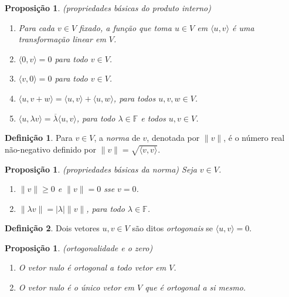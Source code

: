 \documentclass[12pt]{article}
\theoremstyle{plain}
\newtheorem{prop}[thm]{Proposição}
\theoremstyle{definition}
\newtheorem{defn}{Definição}[section]
\theoremstyle{remark}
\begin{document}
\begin{prop} (propriedades básicas do produto interno)
    \begin{enumerate}
        \item [\textup{(a)}] Para cada \(v \in V\) fixado, a função que toma \(u \in V\) em \(\langle u, v \rangle\) é uma transformação linear em \(V\).
        \item [\textup{(b)}] \(\langle 0, v \rangle = 0\) para todo \(v \in V\).
        \item [\textup{(c)}] \(\langle v, 0 \rangle = 0\) para todo \(v \in V\).
        \item [\textup{(d)}] \(\langle u, v + w \rangle = \langle u, v \rangle + \langle u, w \rangle\), para todos \(u, v, w \in V\).
        \item [\textup{(e)}] \(\langle u, \lambda v \rangle = \overline{\lambda} \langle u, v \rangle\), para todo \(\lambda \in \mathbb{F}\) e todos \(u, v \in V\).
    \end{enumerate}
\end{prop}

\begin{defn}
    Para \(v \in V\), a \emph{norma} de \(v\), denotada por \(\|v\|\), é o número real não-negativo definido por \(\|v\| = \sqrt{\langle v, v \rangle}\).
\end{defn}

\begin{prop} (propriedades básicas da norma)
    Seja \(v \in V\).
    \begin{enumerate}
        \item [\textup{(a)}] \(\|v\| \geq 0\) e \(\|v\| = 0\) sse \(v = 0\).
        \item [\textup{(b)}] \(\|\lambda v\| = |\lambda| \|v\|\), para todo \(\lambda \in \mathbb{F}\).
    \end{enumerate}
\end{prop}

\begin{defn}
    Dois vetores \(u, v \in V\) são ditos \emph{ortogonais} se \(\langle u, v \rangle = 0\).
\end{defn}

\begin{prop} (ortogonalidade e o zero)
    \begin{enumerate}
        \item [\textup{(a)}] O vetor nulo é ortogonal a todo vetor em \(V\).
        \item [\textup{(b)}] O vetor nulo é o único vetor em \(V\) que é ortogonal a si mesmo.
    \end{enumerate}
\end{prop}
\end{document}
